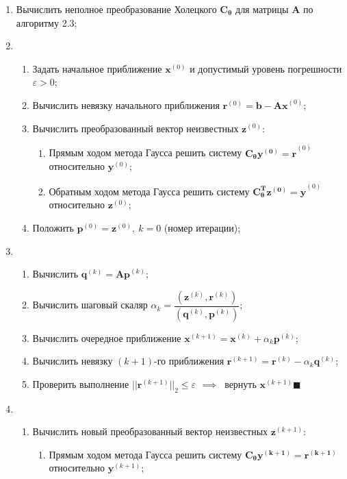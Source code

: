\begin{enumerate}
    \item Вычислить неполное преобразование Холецкого $\mathbf{C_\theta}$ для матрицы $\mathbf{A}$ по алгоритму 2.3;

    \item \begin{enumerate}
        \item Задать начальное приближение $\mathbf{x}^{(0)}$ и допустимый уровень погрешности $\varepsilon>0$;
        \item Вычислить невязку начального приближения $\mathbf{r}^{(0)}=\mathbf{b-Ax}^{(0)}$;

        \item Вычислить преобразованный вектор неизвестных $\mathbf{z}^{(0)}$:
        \begin{enumerate}
            \item Прямым ходом метода Гаусса решить систему $\mathbf{C_\theta y^{(0)} = r}^{(0)}$ относительно $\mathbf{y}^{(0)}$;

            \item Обратным ходом метода Гаусса решить систему $\mathbf{C_\theta^T z^{(0)} = y}^{(0)}$ относительно $\mathbf{z}^{(0)}$;
        \end{enumerate}

        \item Положить $\mathbf{p}^{(0)}=\mathbf{z}^{(0)},~k=0$ (номер итерации);
    \end{enumerate}
    \item \begin{enumerate}
        \item Вычислить $\mathbf{q}^{(k)}=\mathbf{Ap}^{(k)}$;
        \item Вычислить шаговый скаляр $\alpha_k=\dfrac{(\mathbf{z}^{(k)}, \mathbf{r}^{(k)})}{(\mathbf{q}^{(k)}, \mathbf{p}^{(k)})}$;
        \item Вычислить очередное приближение $\mathbf{x}^{(k+1)}=\mathbf{x}^{(k)}+\alpha_k\mathbf{p}^{(k)}$;
        \item Вычислить невязку $(k+1)$-го приближения $\mathbf{r}^{(k+1)}=\mathbf{r}^{(k)}-\alpha_k\mathbf{q}^{(k)}$;
        \item Проверить выполнение $||\mathbf{r}^{(k+1)}||_2 \le \varepsilon ~~\implies ~$ вернуть $\mathbf{x}^{(k+1)} \blacksquare$
    \end{enumerate}
    \item \begin{enumerate}
        \item Вычислить новый преобразованный вектор неизвестных $\mathbf{z}^{(k+1)}$:
        \begin{enumerate}
            \item Прямым ходом метода Гаусса решить систему $\mathbf{C_\theta y^{(k+1)} = r^{(k+1)}}$ относительно $\mathbf{y}^{(k+1)}$;


\end{enumerate}
\end{enumerate}
\end{enumerate}
